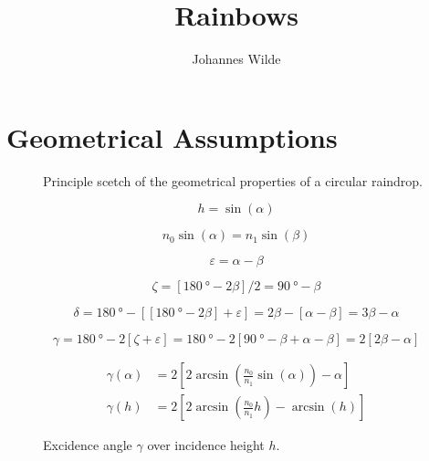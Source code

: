 \documentclass[pagesize=pdftex,paper=a4,fontsize=12pt]{scrartcl}
\title{Rainbows}
\author{Johannes Wilde}
\begin{document}
\maketitle

\section{Geometrical Assumptions}



\begin{figure}[h!]
	\centering
	
	\caption{Principle scetch of the geometrical properties of a circular raindrop.}
	\label{fig:PrincipleScetch}
\end{figure}


\[ h = \sin(\alpha) \]

\[ n_0 \sin(\alpha) = n_1 \sin(\beta) \]

\[ \varepsilon = \alpha - \beta \]

\[ \zeta = [\SI{180}{\degree} - 2 \beta] / 2 = \SI{90}{\degree} - \beta \]

\[ \delta = \SI{180}{\degree} - [[\SI{180}{\degree} - 2 \beta] + \varepsilon] = 2 \beta - [\alpha - \beta] = 3 \beta - \alpha \]

\[ \gamma = \SI{180}{\degree} - 2 [\zeta + \varepsilon] = \SI{180}{\degree} - 2 [\SI{90}{\degree} - \beta + \alpha - \beta] = 2 [2 \beta - \alpha] \]

\begin{align}
	\gamma (\alpha) & = 2 \left[2 \arcsin\left(\frac{n_0}{n_1} \sin(\alpha)\right) - \alpha\right] \nonumber \\[.5em]
	\gamma (h) & = 2 \left[2 \arcsin\left(\frac{n_0}{n_1} h\right) - \arcsin(h)\right]
\end{align}

\begin{figure}[h!]
	\centering
	\caption{Excidence angle $\gamma$ over incidence height $h$.}
	\label{fig:GammaOverH}
\end{figure}
\end{document}

